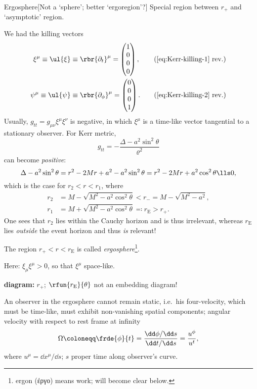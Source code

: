 \begin{nameddef}{Ergosphere}[Not a `sphere'; better `ergoregion'?]
Special region between $r_+$ and `asymptotic' region.

We had the killing vectors
\begin{align}
\xi^\mu \equiv \ul{\xi} &\equiv \rbr{\partial_t}^\mu =
\begin{pmatrix} 1 \\ 0 \\ 0 \\ 0 \end{pmatrix},
\tag{\ref{eq:Kerr-killing-1} rev.} \\
\psi^\mu \equiv \ul{\psi} &\equiv \rbr{\partial_\phi}^\mu =
\begin{pmatrix} 0 \\ 0 \\ 0 \\ 1 \end{pmatrix}.
\tag{\ref{eq:Kerr-killing-2} rev.}
\end{align}
Usually, $g_{tt} = g_{\mu\nu}\xi^\mu \xi^\nu$ is negative, in which $\xi^\mu$
is a time-like vector tangential to a stationary observer. For Kerr metric,
\begin{equation}
g_{tt} = -\frac{\Delta - a^2\sin^2\theta}{\varrho^2}
\end{equation}
can become \emph{positive}:
\begin{equation}
\Delta - a^2\sin^2\theta = r^2 - 2Mr + a^2 - a^2\sin^2\theta =
r^2 - 2Mr + a^2\cos^2\theta \lls 0,
\end{equation}
which is the case for $r_2 < r < r_1$, where
\begin{align}
r_2 &= M - \sqrt{M^2 - a^2\cos^2\theta} < r_- = M - \sqrt{M^2-a^2},
\\
r_1 &= M + \sqrt{M^2 - a^2\cos^2\theta} \eqqcolon r_\text{E} > r_+.
\end{align}
One sees that $r_2$ lies within the Cauchy horizon and is thus irrelevant,
whereas $r_\text{E}$ lies \emph{outside} the event horizon and thus \emph{is}
relevant!

The region $r_+ < r < r_\text{E}$ is called \emph{ergosphere}\footnote{ergon
(έργο) means work; will become clear below.}.

Here: $\xi_\mu \xi^\mu > 0$, so that $\xi^\mu$ space-like.

\textbf{diagram:} $r_+$; $\rfun{r_\text{E}}{\theta}$ not an embedding
diagram!

An observer in the ergosphere cannot remain static, i.e.\ his four-velocity,
which must be time-like, must exhibit non-vanishing spatial components;
angular velocity with respect to rest frame at infinity
\begin{equation}
\Omega \coloneqq \frde{\phi}{t} = \frac{\dd \phi/\dd s}{\dd t/\dd s}
= \frac{u^\phi}{u^t},
\label{eq:Omega=dphi/dt}
\end{equation}
where $u^\mu = \dd x^\mu/\dd s$; $s$ proper time along observer's curve.


\end{nameddef}
